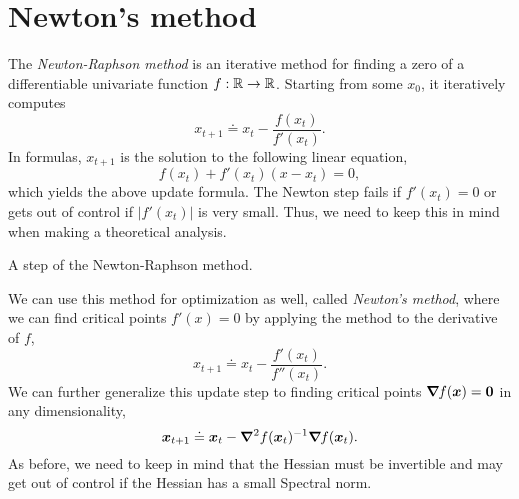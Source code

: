 \section{Newton's method}


The \textit{Newton-Raphson method} is an iterative method for finding a zero of a differentiable
univariate function $f: \mathbb{R} \to \mathbb{R}$. Starting from some $x_0$, it iteratively computes \[
    x_{t+1} \doteq x_t - \frac{f(x_t)}{f'(x_t)}.
\]
In formulas, $x_{t+1}$ is the solution to the following linear equation, \[
    f(x_t) + f'(x_t) (x - x_t) = 0,
\]
which yields the above update formula. The Newton step fails if $f'(x_t) = 0$ or gets out of
control if $|f'(x_t)|$ is very small. Thus, we need to keep this in mind when making a theoretical
analysis.

\begin{marginfigure}
    \centering
    \caption{A step of the Newton-Raphson method.}
    \label{fig:newton-raphson}
\end{marginfigure}

We can use this method for optimization as well, called \textit{Newton's method}, where we can find
critical points $f'(x) = 0$ by applying the method to the derivative of $f$, \[
    x_{t+1} \doteq x_t - \frac{f'(x_t)}{f''(x_t)}.
\]
We can further generalize this update step to finding critical points $\bm{\nabla}_{\! } f(\bm{x}) =
    \bm{0}$ in any dimensionality, \[
    \bm{x}_{t+1} \doteq \bm{x}_t - \bm{\nabla}^2_{\! } f(\bm{x}_t)^{-1} \bm{\nabla}_{\! } f(\bm{x}_t).
\]
As before, we need to keep in mind that the Hessian must be invertible and may get out of control
if the Hessian has a small Spectral norm.

